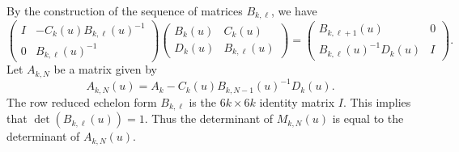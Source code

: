 \documentclass[11pt]{amsart}
\theoremstyle{definition}
\theoremstyle{remark}
\numberwithin{equation}{section}
\begin{document}
By the construction of the sequence of matrices $B_{k,\ell}$, we have
\begin{equation*}
\begin{pmatrix}
I&-C_k(u)B_{k,\ell}(u)^{-1}\\
0&B_{k,\ell}(u)^{-1}
\end{pmatrix}
\begin{pmatrix}
B_{k}(u)&C_k(u)\\
D_{k}(u)&B_{k,\ell}(u)
\end{pmatrix}
=\begin{pmatrix}
B_{k,\ell+1}(u)&0\\
B_{k,\ell}(u)^{-1}D_{k}(u)&I
\end{pmatrix}.
\end{equation*}
Let $A_{k,N}$ be a matrix given by
$$A_{k,N}(u)=A_k-C_k(u)B_{k,N-1}(u)^{-1}D_k(u).$$
The row reduced echelon form $B_{k,\ell}$ is the $6k\times 6k$ identity matrix $I$. This implies that $\det(B_{k,\ell}(u))=1$.
Thus the determinant of $M_{k,N}(u)$ is equal to the determinant of $A_{k,N}(u)$.
\end{document}
